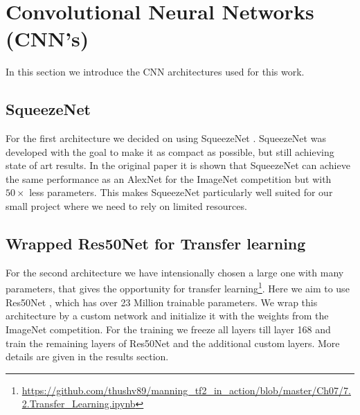 \documentclass[11pt]{article}
\begin{document}
\section{Convolutional Neural Networks (CNN's)}
In this section we introduce the CNN architectures used for this work.

\subsection{SqueezeNet}
For the first architecture we decided on using SqueezeNet \cite{iandola2016}. SqueezeNet was developed with the goal to make it as compact as possible, but still achieving state of art results. In the original paper it is shown that SqueezeNet can achieve the same performance as an AlexNet for the ImageNet competition but with $50\times$ less parameters. This makes SqueezeNet particularly well suited for our small project where we need to rely on limited resources.

\subsection{Wrapped Res50Net for Transfer learning}
For the second architecture we have intensionally chosen a large one with many parameters, that gives the opportunity for transfer learning\footnote{\url{https://github.com/thushv89/manning_tf2_in_action/blob/master/Ch07/7.2.Transfer_Learning.ipynb}}. Here we aim to use Res50Net \cite{he2016deep}, which has over 23 Million trainable parameters. We wrap this architecture by a custom network and initialize it with the weights from the ImageNet competition. For the training we freeze all layers till layer 168 and train the remaining layers of Res50Net and the additional custom layers. More details are given in the results section.
\end{document}
